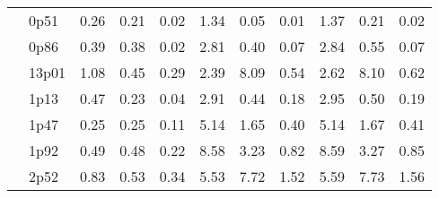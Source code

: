 \documentclass[12pt,A4paper]{article}
\begin{document}
\begin{table}[]
\begin{tabular}{lllllllllll}
\multicolumn{1}{|l|}{} & \multicolumn{1}{l|}{0p51} & \multicolumn{1}{c|}{0.26}        & \multicolumn{1}{c|}{0.21}         & \multicolumn{1}{c|}{0.02}        & \multicolumn{1}{c|}{1.34}         & \multicolumn{1}{c|}{0.05}        & \multicolumn{1}{c|}{0.01}        & \multicolumn{1}{c|}{1.37}        & \multicolumn{1}{c|}{0.21}        & \multicolumn{1}{c|}{0.02}         \\ \cline{2-11}
\multicolumn{1}{|l|}{} & \multicolumn{1}{l|}{0p86} & \multicolumn{1}{c|}{0.39}        & \multicolumn{1}{c|}{0.38}         & \multicolumn{1}{c|}{0.02}        & \multicolumn{1}{c|}{2.81}         & \multicolumn{1}{c|}{0.40}        & \multicolumn{1}{c|}{0.07}        & \multicolumn{1}{c|}{2.84}        & \multicolumn{1}{c|}{0.55}        & \multicolumn{1}{c|}{0.07}         \\ \cline{2-11}
\multicolumn{1}{|l|}{} & \multicolumn{1}{l|}{13p01} & \multicolumn{1}{c|}{1.08}        & \multicolumn{1}{c|}{0.45}         & \multicolumn{1}{c|}{0.29}        & \multicolumn{1}{c|}{2.39}         & \multicolumn{1}{c|}{8.09}        & \multicolumn{1}{c|}{0.54}        & \multicolumn{1}{c|}{2.62}        & \multicolumn{1}{c|}{8.10}        & \multicolumn{1}{c|}{0.62}         \\ \cline{2-11}
\multicolumn{1}{|l|}{} & \multicolumn{1}{l|}{1p13} & \multicolumn{1}{c|}{0.47}        & \multicolumn{1}{c|}{0.23}         & \multicolumn{1}{c|}{0.04}        & \multicolumn{1}{c|}{2.91}         & \multicolumn{1}{c|}{0.44}        & \multicolumn{1}{c|}{0.18}        & \multicolumn{1}{c|}{2.95}        & \multicolumn{1}{c|}{0.50}        & \multicolumn{1}{c|}{0.19}         \\ \cline{2-11}
\multicolumn{1}{|l|}{} & \multicolumn{1}{l|}{1p47} & \multicolumn{1}{c|}{0.25}        & \multicolumn{1}{c|}{0.25}         & \multicolumn{1}{c|}{0.11}        & \multicolumn{1}{c|}{5.14}         & \multicolumn{1}{c|}{1.65}        & \multicolumn{1}{c|}{0.40}        & \multicolumn{1}{c|}{5.14}        & \multicolumn{1}{c|}{1.67}        & \multicolumn{1}{c|}{0.41}         \\ \cline{2-11}
\multicolumn{1}{|l|}{} & \multicolumn{1}{l|}{1p92} & \multicolumn{1}{c|}{0.49}        & \multicolumn{1}{c|}{0.48}         & \multicolumn{1}{c|}{0.22}        & \multicolumn{1}{c|}{8.58}         & \multicolumn{1}{c|}{3.23}        & \multicolumn{1}{c|}{0.82}        & \multicolumn{1}{c|}{8.59}        & \multicolumn{1}{c|}{3.27}        & \multicolumn{1}{c|}{0.85}         \\ \cline{2-11}
\multicolumn{1}{|l|}{} & \multicolumn{1}{l|}{2p52} & \multicolumn{1}{c|}{0.83}        & \multicolumn{1}{c|}{0.53}         & \multicolumn{1}{c|}{0.34}        & \multicolumn{1}{c|}{5.53}         & \multicolumn{1}{c|}{7.72}        & \multicolumn{1}{c|}{1.52}        & \multicolumn{1}{c|}{5.59}        & \multicolumn{1}{c|}{7.73}        & \multicolumn{1}{c|}{1.56}         \\ \cline{2-11}

\end{tabular}
\end{table}
\end{document}
